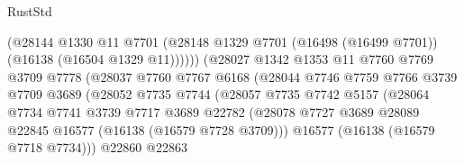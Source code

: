 \begin{lexlean}{RustStd}
\begin{coremodule}
                                      (@28144
                                        @1330
                                        @11
                                        @7701
                                        (@28148
                                          @1329
                                          @7701
                                          (@16498 (@16499 @7701))
                                          (@16138 (@16504 @1329 @11))))))
                                  (@28027
                                    @1342
                                    @1353
                                    @11
                                    @7760
                                    @7769
                                    @3709
                                    @7778
                                    (@28037
                                      @7760
                                      @7767
                                      @6168
                                      (@28044
                                        @7746
                                        @7759
                                        @7766
                                        @3739
                                        @7709
                                        @3689
                                        (@28052
                                          @7735
                                          @7744
                                          (@28057
                                            @7735
                                            @7742
                                            @5157
                                            (@28064
                                              @7734
                                              @7741
                                              @3739
                                              @7717
                                              @3689
                                              @22782
                                              (@28078
                                                @7727
                                                @3689
                                                @28089
                                                @22845
                                                @16577
                                                (@16138 (@16579 @7728 @3709)))
                                              @16577
                                              (@16138 (@16579 @7718 @7734)))
                                            @22860
                                            @22863

\end{coremodule}
\end{lexlean}
